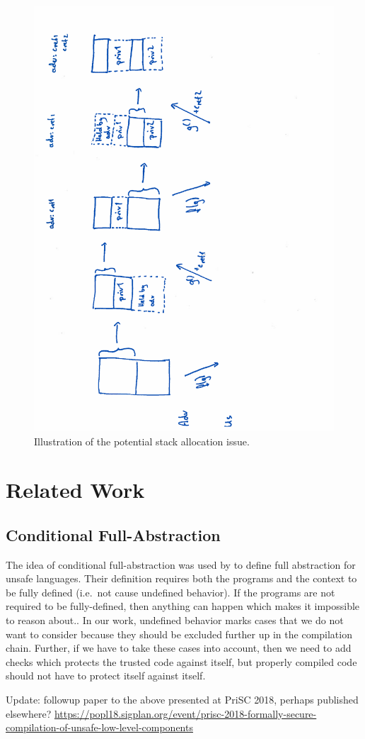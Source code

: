 \documentclass[a4paper]{article}
\begin{document}
\begin{figure}
  \centering
  \includegraphics[angle=270,trim={0 0 5cm 0},width=\textwidth]{img/stk-alloc.pdf}
  \caption{Illustration of the potential stack allocation issue.}
  \label{fig:stk-alloc}
\end{figure}



\section{Related Work}
\subsection{Conditional Full-Abstraction}
The idea of conditional full-abstraction was used by \citet{Juglaret2016} to define full abstraction for unsafe languages. Their definition requires both the programs and the context to be fully defined (i.e.\ not cause undefined behavior). If the programs are not required to be fully-defined, then anything can happen which makes it impossible to reason about.. In our work, undefined behavior marks cases that we do not want to consider because they should be excluded further up in the compilation chain. Further, if we have to take these cases into account, then we need to add checks which protects the trusted code against itself, but properly compiled code should not have to protect itself against itself.

Update: followup paper to the above presented at PriSC 2018, perhaps published elsewhere?
\url{https://popl18.sigplan.org/event/prisc-2018-formally-secure-compilation-of-unsafe-low-level-components}


\end{document}
